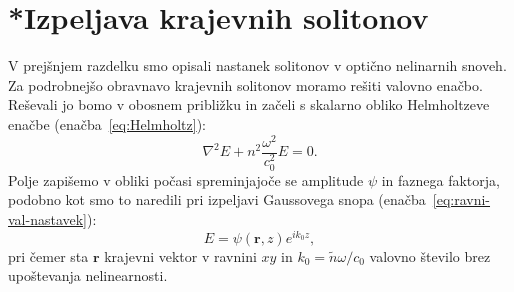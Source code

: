 \section{*Izpeljava krajevnih solitonov}
\label{chap:ks}
V prejšnjem razdelku smo opisali nastanek solitonov v optično nelinarnih snoveh. 
Za podrobnejšo obravnavo krajevnih solitonov moramo rešiti valovno 
enačbo. Reševali jo bomo v obosnem približku in začeli s skalarno obliko Helmholtzeve enačbe (enačba~\ref{eq:Helmholtz}):
\begin{equation}
\nabla^{2}E+n^{2}\frac{\omega^{2}}{c_0^{2}}E=0.
\label{8.80}
\end{equation}
Polje zapišemo v obliki počasi spreminjajoče se amplitude $\psi$ in faznega faktorja, 
podobno kot smo to naredili pri izpeljavi Gaussovega snopa (enačba~\ref{eq:ravni-val-nastavek}):
\begin{equation}
E=\psi(\mathbf{r},z)e^{ik_{0}z},
\label{8.81}
\end{equation}
pri čemer sta $\mathbf{r}$ krajevni vektor v ravnini $xy$ in $k_{0}=\tilde{n}\omega/c_0$ valovno število brez upoštevanja nelinearnosti.
 
